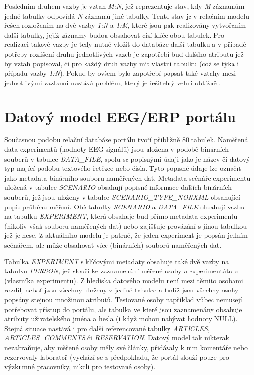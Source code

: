 \documentclass{projekt}
\begin{document}
Posledním druhem vazby je vztah {\it M:N}, jež reprezentuje stav, kdy {\it M} záznamům jedné tabulky odpovídá {\it N} záznamů jiné tabulky. Tento stav je v relačním modelu řešen rozložením na dvě vazby {\it 1:N} a {\it 1:M}, které jsou pak realizovány vytvořením další tabulky, jejíž záznamy budou obsahovat cizí klíče obou tabulek. Pro realizaci takové vazby je tedy nutné vložit do databáze další tabulku a v případě potřeby rozlišení druhu jednotlivých vazeb je zapotřebí buď dalšího atributu jež by vztah popisoval, či pro každý druh vazby mít vlastní tabulku (což se týká i případu vazby {\it 1:N}). Pokud by ovšem bylo zapotřebí popsat také vztahy mezi jednotlivými vazbami nastává problém, který je řešitelný velmi obtížně \cite{_20}.


\section{Datový model EEG/ERP portálu}
\hspace{0.65cm}Současnou podobu relační databáze portálu tvoří přibližně 80 tabulek. Naměřená data experimentů (hodnoty EEG signálů) jsou uložena v podobě binárních souborů v tabulce {\it DATA\_FILE}, spolu se popisnými údaji jako je název či datový typ mající podobu textového řetězce nebo čísla. Tyto popisné údaje lze označit jako metadata binárního souboru naměřených dat. Metadata scénáře experimentu uložená v tabulce {\it SCENARIO} obsahují popisné informace dalších binárních souborů, jež jsou uloženy v tabulce {\it SCENARIO\_TYPE\_NONXML} obsahující popis průběhu měření. Obě tabulky {\it SCENARIO} a {\it DATA\_FILE} obsahují vazbu na tabulku {\it EXPERIMENT}, která obsahuje buď přímo metadata experimentu (nikoliv však souboru naměřených dat) nebo zajišťuje provázání s jinou tabulkou jež je nese. Z aktuálního modelu je patrné, že jeden experiment je popsán jedním scénářem, ale může obsahovat více (binárních) souborů naměřených dat.

Tabulka {\it EXPERIMENT} s klíčovými metadaty obsahuje také dvě vazby na tabulku {\it PERSON}, jež slouží ke zaznamenání měřené osoby a experimentátora (vlastníka experimentu). Z hlediska datového modelu není mezi těmito osobami rozdíl, neboť jsou všechny uloženy v jediné tabulce a tudíž jsou všechny osoby popsány stejnou množinou atributů. Testované osoby například vůbec nemusejí potřebovat přístup do portálu, ale tabulka ve které jsou zaznamenány obsahuje atributy uživatelského jména a hesla (i když mohou nabývat hodnoty NULL). Stejná situace nastává i pro další referencované tabulky {\it ARTICLES}, {\it ARTICLES\_COMMENTS} či {\it RESERVATION}. Datový model tak nikterak nezabraňuje, aby měřené osoby měly své články, přidávaly k nim komentáře nebo rezervovaly laboratoř (vychází se z předpokladu, že portál slouží pouze pro výzkumné pracovníky, nikoli pro testované osoby). 
\end{document}
